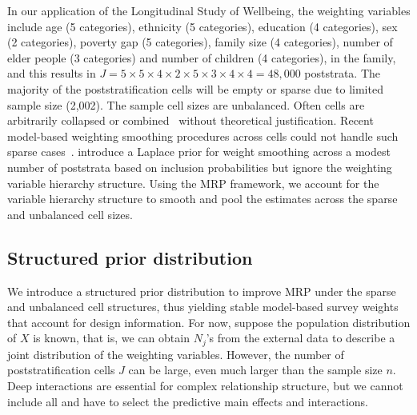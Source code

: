 \documentclass[11pt]{article}
\begin{document}
In our application of the Longitudinal Study of Wellbeing, the weighting variables include age (5 categories), ethnicity (5 categories), education (4 categories), sex (2 categories), poverty gap (5 categories), family size (4 categories), number of elder people (3 categories) and number of children (4 categories), in the family, and this results in $J=5\times5\times4\times2\times5\times3\times4\times4=48,000$ poststrata. The majority of the poststratification cells will be empty or sparse due to limited sample size (2,002). The sample cell sizes are unbalanced. Often cells are arbitrarily collapsed or combined~\citep{little93} without theoretical justification. Recent model-based weighting smoothing procedures across cells could not handle such sparse cases~\citep{modeltrim-elliottandlittle00}. \cite{elliot:JOS16} introduce a Laplace prior for weight smoothing across a modest number of poststrata based on inclusion probabilities but ignore the weighting variable hierarchy structure. Using the MRP framework, we  account for the variable hierarchy structure to smooth and pool the estimates across the sparse and unbalanced cell sizes.

\subsection{Structured prior distribution}

We introduce a structured prior distribution to improve MRP under the sparse and unbalanced cell structures, thus yielding stable model-based survey weights that account for design information. For now, suppose the population distribution of $X$ is known, that is, we can obtain $N_j$'s from the external data to describe a joint distribution of the weighting variables. However, the number of poststratification cells $J$ can be large, even much larger than the sample size $n$. Deep interactions are essential for complex relationship structure, but we cannot include all and have to select the predictive main effects and interactions. 
\end{document}
